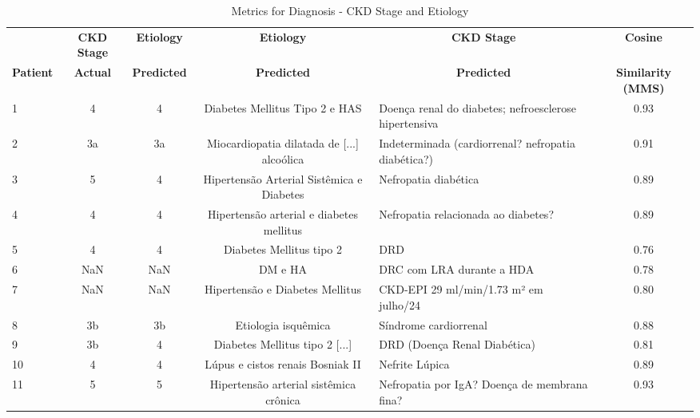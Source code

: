 \begin{table*}[h]
    \centering
    \caption{Metrics for Diagnosis - CKD Stage and Etiology}
    \begin{tabular}{lccclc}
        \toprule
        & \multicolumn{1}{c}{\textbf{CKD Stage}} & \multicolumn{1}{c}{\textbf{Etiology}}  & \multicolumn{1}{c}{\textbf{Etiology}} & \multicolumn{1}{c}{\textbf{CKD Stage}} & \multicolumn{1}{c}{\textbf{Cosine}}           \\
\textbf{Patient}    & \multicolumn{1}{c}{\textbf{Actual}}    & \multicolumn{1}{c}{\textbf{Predicted}} & \multicolumn{1}{c}{\textbf{Predicted}} & \multicolumn{1}{c}{\textbf{Predicted}} & \multicolumn{1}{c}{\textbf{Similarity (MMS)}} \\
\toprule
    1  & 4   & 4   & Diabetes Mellitus Tipo 2 e HAS                & Doença renal do diabetes; nefroesclerose hipertensiva     & 0.93 \\
    2  & 3a  & 3a  & Miocardiopatia dilatada de [...] alcoólica    & Indeterminada (cardiorrenal? nefropatia diabética?)       & 0.91 \\
    3  & 5   & 4   & Hipertensão Arterial Sistêmica e Diabetes     & Nefropatia diabética                                      & 0.89 \\
    4  & 4   & 4   & Hipertensão arterial e diabetes mellitus      & Nefropatia relacionada ao diabetes?                      & 0.89 \\
    5  & 4   & 4   & Diabetes Mellitus tipo 2                      & DRD                                                      & 0.76 \\
    6  & NaN & NaN & DM e HA                                       & DRC com LRA durante a HDA                                & 0.78 \\
    7  & NaN & NaN & Hipertensão e Diabetes Mellitus               & CKD-EPI 29 ml/min/1.73 m² em julho/24                    & 0.80 \\
    8  & 3b  & 3b  & Etiologia isquêmica                           & Síndrome cardiorrenal                                    & 0.88 \\
    9  & 3b  & 4   & Diabetes Mellitus tipo 2 [...]                & DRD (Doença Renal Diabética)                             & 0.81 \\
    10 & 4   & 4   & Lúpus e cistos renais Bosniak II              & Nefrite Lúpica                                           & 0.89 \\
    11 & 5   & 5   & Hipertensão arterial sistêmica crônica        & Nefropatia por IgA? Doença de membrana fina?             & 0.93 \\

\end{tabular}
\end{table*}
